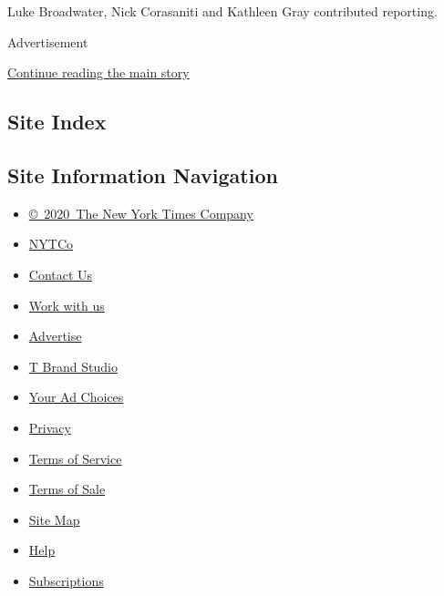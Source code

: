 Luke Broadwater, Nick Corasaniti and Kathleen Gray contributed
reporting.

Advertisement

\protect\hyperlink{after-bottom}{Continue reading the main story}

\hypertarget{site-index}{%
\subsection{Site Index}\label{site-index}}

\hypertarget{site-information-navigation}{%
\subsection{Site Information
Navigation}\label{site-information-navigation}}

\begin{itemize}
\tightlist
\item
  \href{https://help.nytimes.com/hc/en-us/articles/115014792127-Copyright-notice}{©~2020~The
  New York Times Company}
\end{itemize}

\begin{itemize}
\tightlist
\item
  \href{https://www.nytco.com/}{NYTCo}
\item
  \href{https://help.nytimes.com/hc/en-us/articles/115015385887-Contact-Us}{Contact
  Us}
\item
  \href{https://www.nytco.com/careers/}{Work with us}
\item
  \href{https://nytmediakit.com/}{Advertise}
\item
  \href{http://www.tbrandstudio.com/}{T Brand Studio}
\item
  \href{https://www.nytimes.com/privacy/cookie-policy\#how-do-i-manage-trackers}{Your
  Ad Choices}
\item
  \href{https://www.nytimes.com/privacy}{Privacy}
\item
  \href{https://help.nytimes.com/hc/en-us/articles/115014893428-Terms-of-service}{Terms
  of Service}
\item
  \href{https://help.nytimes.com/hc/en-us/articles/115014893968-Terms-of-sale}{Terms
  of Sale}
\item
  \href{https://spiderbites.nytimes.com}{Site Map}
\item
  \href{https://help.nytimes.com/hc/en-us}{Help}
\item
  \href{https://www.nytimes.com/subscription?campaignId=37WXW}{Subscriptions}
\end{itemize}
